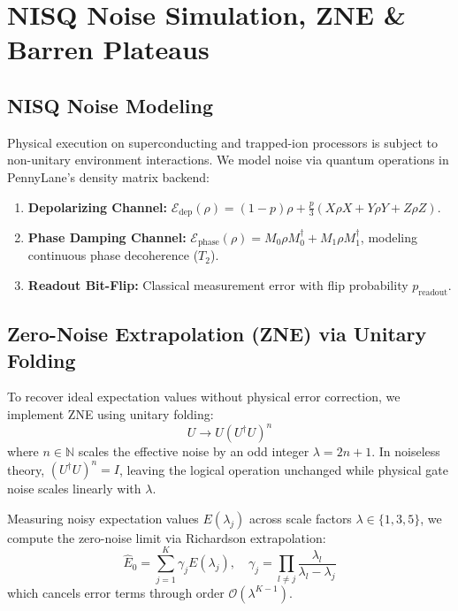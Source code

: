 \section{NISQ Noise Simulation, ZNE \& Barren Plateaus}
\label{sec:noise}

\subsection{NISQ Noise Modeling}
Physical execution on superconducting and trapped-ion processors is subject to non-unitary environment interactions. We model noise via quantum operations in PennyLane's density matrix backend:
\begin{enumerate}
    \item \textbf{Depolarizing Channel:} $\mathcal{E}_{\text{dep}}(\rho) = (1 - p)\rho + \frac{p}{3}(X\rho X + Y\rho Y + Z\rho Z)$.
    \item \textbf{Phase Damping Channel:} $\mathcal{E}_{\text{phase}}(\rho) = M_0 \rho M_0^\dagger + M_1 \rho M_1^\dagger$, modeling continuous phase decoherence ($T_2$).
    \item \textbf{Readout Bit-Flip:} Classical measurement error with flip probability $p_{\text{readout}}$.
\end{enumerate}

\subsection{Zero-Noise Extrapolation (ZNE) via Unitary Folding}
To recover ideal expectation values without physical error correction, we implement ZNE using unitary folding:
\begin{equation}
    U \longrightarrow U \left( U^\dagger U \right)^n
\end{equation}
where $n \in \mathbb{N}$ scales the effective noise by an odd integer $\lambda = 2n + 1$. In noiseless theory, $(U^\dagger U)^n = I$, leaving the logical operation unchanged while physical gate noise scales linearly with $\lambda$.

Measuring noisy expectation values $E(\lambda_j)$ across scale factors $\lambda \in \{1, 3, 5\}$, we compute the zero-noise limit via Richardson extrapolation:
\begin{equation}
    \hat{E}_0 = \sum_{j=1}^K \gamma_j E(\lambda_j), \quad \gamma_j = \prod_{l \neq j} \frac{\lambda_l}{\lambda_l - \lambda_j}
\end{equation}
which cancels error terms through order $\mathcal{O}(\lambda^{K-1})$.

